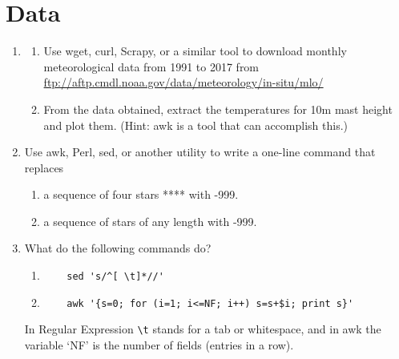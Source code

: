 \documentclass{article}
\begin{document}
\section{Data}
\begin{enumerate}
  
\item \label{exrc:wgetmlo} 
  \begin{enumerate}\setlength{\itemsep}{0pt}
  \item Use wget, curl, Scrapy, or a similar tool to download monthly meteorological data from 1991 to 2017 from \url{ftp://aftp.cmdl.noaa.gov/data/meteorology/in-situ/mlo/}
 
  \item From the data obtained, extract the temperatures for 10m mast height and plot them.
    (Hint: awk is a tool that can accomplish this.)
  \end{enumerate}


\item Use awk, Perl, sed, or another utility to write a one-line command that replaces
  \begin{enumerate}\setlength{\itemsep}{0pt}
  \item a sequence of four stars **** with -999.
  \item a sequence of stars of any length with -999.
  \end{enumerate}


\item What do the following commands do?
  \begin{enumerate}\setlength{\itemsep}{0pt}
  \item
\begin{verbatim}
    sed 's/^[ \t]*//' 
\end{verbatim}
  \item
\begin{verbatim}
    awk '{s=0; for (i=1; i<=NF; i++) s=s+$i; print s}'
\end{verbatim}
\end{enumerate}
In Regular Expression \verb+\t+ stands for a tab or whitespace,
and in awk the variable `NF' is the number of fields (entries in a row).


\end{enumerate}






\newpage
\end{document}
